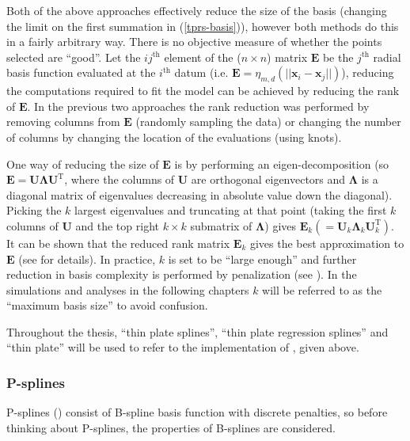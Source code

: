 Both of the above approaches effectively reduce the size of the basis (changing the limit on the first summation in (\ref{tprs-basis})), however both methods do this in a fairly arbitrary way. There is no objective measure of whether the points selected are ``good''. Let the $ij^\text{th}$ element of the ($n \times n$) matrix $\mathbf{E}$ be the $j^\text{th}$ radial basis function evaluated at the $i^\text{th}$ datum (i.e. $\mathbf{E} = \eta_{m,d}\left (\vert\vert\mathbf{x}_i - \mathbf{x}_j \vert\vert \right )$), reducing the computations required to fit the model can be achieved by reducing the rank of $\mathbf{E}$. In the previous two approaches the rank reduction was performed by removing columns from $\mathbf{E}$ (randomly sampling the data) or changing the number of columns by changing the location of the evaluations (using knots). 

One way of reducing the size of $\mathbf{E}$ is by performing an eigen-decomposition (so $\mathbf{E}=\mathbf{U}\mathbf{\Lambda}\mathbf{U}^\text{T}$, where the columns of $\mathbf{U}$ are orthogonal eigenvectors and $\mathbf{\Lambda}$ is a diagonal matrix of eigenvalues decreasing in absolute value down the diagonal). Picking the $k$ largest eigenvalues and truncating at that point (taking the first $k$ columns of $\mathbf{U}$ and the top right $k\times k$ submatrix of $\mathbf{\Lambda}$) gives $\mathbf{E}_k(=\mathbf{U}_k\mathbf{\Lambda}_k\mathbf{U}_k^\text{T})$. It can be shown that the reduced rank matrix $\mathbf{E}_k$ gives the best approximation to $\mathbf{E}$ (see \cite{wood2003} for details). In practice, $k$ is set to be ``large enough'' and further reduction in basis complexity is performed by penalization (see ). In the simulations and analyses in the following chapters $k$ will be referred to as the ``maximum basis size'' to avoid confusion.

Throughout the thesis, ``thin plate splines'', ``thin plate regression splines'' and ``thin plate'' will be used to refer to the implementation of , given above.

\subsubsection{P-splines}
\label{intro-psplines}

P-splines (\cite{eilersmarx96}) consist of B-spline basis function with discrete penalties, so before thinking about P-splines, the properties of B-splines are considered. 

